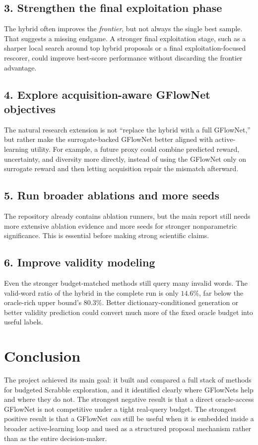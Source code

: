 \documentclass[10pt]{article}
\begin{document}
\subsection{3. Strengthen the final exploitation phase}
The hybrid often improves the \emph{frontier}, but not always the single best sample. That suggests a missing endgame. A stronger final exploitation stage, such as a sharper local search around top hybrid proposals or a final exploitation-focused rescorer, could improve best-score performance without discarding the frontier advantage.

\subsection{4. Explore acquisition-aware GFlowNet objectives}
The natural research extension is not ``replace the hybrid with a full GFlowNet,'' but rather make the surrogate-backed GFlowNet better aligned with active-learning utility. For example, a future proxy could combine predicted reward, uncertainty, and diversity more directly, instead of using the GFlowNet only on surrogate reward and then letting acquisition repair the mismatch afterward.

\subsection{5. Run broader ablations and more seeds}
The repository already contains ablation runners, but the main report still needs more extensive ablation evidence and more seeds for stronger nonparametric significance. This is essential before making strong scientific claims.

\subsection{6. Improve validity modeling}
Even the stronger budget-matched methods still query many invalid words. The valid-word ratio of the hybrid in the complete run is only \(14.6\%\), far below the oracle-rich upper bound's \(80.3\%\). Better dictionary-conditioned generation or better validity prediction could convert much more of the fixed oracle budget into useful labels.

\section{Conclusion}
The project achieved its main goal: it built and compared a full stack of methods for budgeted Scrabble exploration, and it identified clearly where GFlowNets help and where they do not. The strongest negative result is that a direct oracle-access GFlowNet is not competitive under a tight real-query budget. The strongest positive result is that a GFlowNet \emph{can} still be useful when it is embedded inside a broader active-learning loop and used as a structured proposal mechanism rather than as the entire decision-maker.
\end{document}

